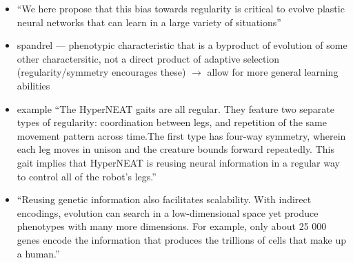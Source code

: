 \begin{itemize}
    \item ``We here propose that this bias towards regularity is critical to evolve plastic neural networks that can learn in a large variety of situations'' \cite{Tonelli2013OnNetworks}
    \item spandrel --- phenotypic characteristic that is a byproduct of evolution of some other charactersitic, not a direct product of adaptive selection (regularity/symmetry encourages these) $\rightarrow$ allow for more general learning abilities \cite{Tonelli2013OnNetworks}
    \item example ``The HyperNEAT gaits are all regular. They feature two separate types of regularity: coordination between legs, and repetition of the same movement pattern across time.The first type has four-way symmetry, wherein each leg moves in unison and the creature bounds forward repeatedly. This gait implies that HyperNEAT is reusing neural information in a regular way to control all of the robot’s legs.'' \cite{Clune2011OnRegularity}
  \item ``Reusing genetic information also facilitates scalability. With indirect encodings, evolution can search in a low-dimensional space yet produce phenotypes with many more dimensions. For example, only about 25 000 genes encode the information that produces the trillions of cells that make up a human.'' \cite{Clune2011OnRegularity}
  \end{itemize}
  
